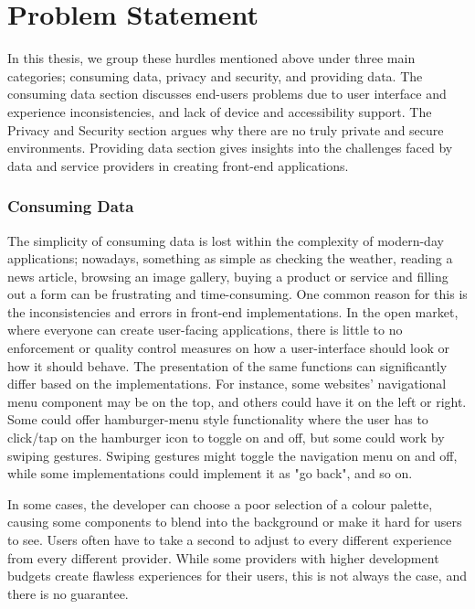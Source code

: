 
\section{Problem Statement}

In this thesis, we group these hurdles mentioned above under three main categories; consuming data, privacy and security, and providing data. The consuming data section discusses end-users problems due to user interface and experience inconsistencies, and lack of device and accessibility support. The Privacy and Security section argues why there are no truly private and secure environments. Providing data section gives insights into the challenges faced by data and service providers in creating front-end applications.

\subsubsection{Consuming Data}

The simplicity of consuming data is lost within the complexity of modern-day applications; nowadays, something as simple as checking the weather, reading a news article, browsing an image gallery, buying a product or service and filling out a form can be frustrating and time-consuming. One common reason for this is the inconsistencies and errors in front-end implementations. In the open market, where everyone can create user-facing applications, there is little to no enforcement or quality control measures on how a user-interface should look or how it should behave. The presentation of the same functions can significantly differ based on the implementations. For instance, some websites' navigational menu component may be on the top, and others could have it on the left or right. Some could offer hamburger-menu style functionality where the user has to click/tap on the hamburger icon to toggle on and off, but some could work by swiping gestures. Swiping gestures might toggle the navigation menu on and off, while some implementations could implement it as "go back", and so on. 

In some cases, the developer can choose a poor selection of a colour palette, causing some components to blend into the background or make it hard for users to see. Users often have to take a second to adjust to every different experience from every different provider. While some providers with higher development budgets create flawless experiences for their users, this is not always the case, and there is no guarantee.

